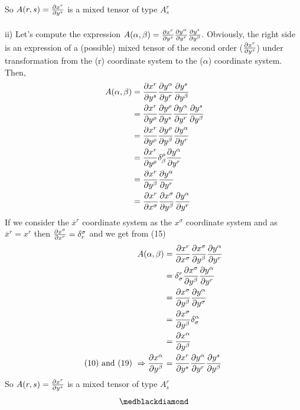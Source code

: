 So $A(r,s) = \pdv{x^r}{y^s}$ is a mixed tensor of type $A_s^r$\\\\
ii) Let's compute the expression $A(\alpha, \beta) = \pdv{x^r}{y^s}\pdv{y^{\alpha}}{y^r}\pdv{y^s}{y^{\beta }}$. Obviously, the right side is an expression of a (possible) mixed tensor of the second order ($\pdv{x^r}{y^s}$) under transformation from the (r) coordinate system to the ($\alpha$) coordinate system. Then, 
\begin{align}
\ A(\alpha, \beta) &= \pdv{x^r}{y^s}\pdv{y^{\alpha}}{y^r}\pdv{y^s}{y^{\beta }}\\
&= \pdv{x^r}{y^{\rho}}\pdv{y^{\rho}}{y^s}\pdv{y^{\alpha}}{y^r}\pdv{y^s}{y^{\beta }}\\
&= \pdv{x^r}{y^{\rho}}\pdv{y^{\rho}}{y^{\beta}}\pdv{y^{\alpha}}{y^r}\\
&= \pdv{x^r}{y^{\rho}}\delta^{\rho}_{\beta}\pdv{y^{\alpha}}{y^r}\\
&= \pdv{x^r}{y^{\beta}}\pdv{y^{\alpha}}{y^r}\\
&= \pdv{x^r}{x^{\sigma}}\pdv{x^{\sigma}}{y^{\beta}}\pdv{y^{\alpha}}{y^r}
\end{align}
If we consider the $\overline{x}^r$ coordinate system as the $x^{\sigma }$ coordinate system and as $\overline{x}^r = x^r$ then $\pdv{x^{\sigma }}{x^r} = \delta^{\sigma}_r$ and we get from (15)
\begin{align}
\ A(\alpha, \beta) &= \pdv{x^r}{x^{\sigma}}\pdv{x^{\sigma}}{y^{\beta}}\pdv{y^{\alpha}}{y^r}\\
\ &= \delta^r_{\sigma}\pdv{x^{\sigma}}{y^{\beta}}\pdv{y^{\alpha}}{y^r}\\
\ &= \pdv{x^{\sigma}}{y^{\beta}}\pdv{y^{\alpha}}{y^{\sigma}}\\
\ &= \pdv{x^{\sigma}}{y^{\beta}}\delta^{\alpha}_{\sigma}\\
\ &= \pdv{x^{\alpha}}{y^{\beta}}\\
\text{(10) and (19)   } \Rightarrow \pdv{x^{\alpha}}{y^{\beta}} &= \pdv{x^r}{y^s}\pdv{y^{\alpha}}{y^r}\pdv{y^s}{y^{\beta }}
\end{align}
So $A(r,s) = \pdv{x^r}{y^s}$ is a mixed tensor of type $A_s^r$
$$\medblackdiamond$$
\pagebreak[4]

